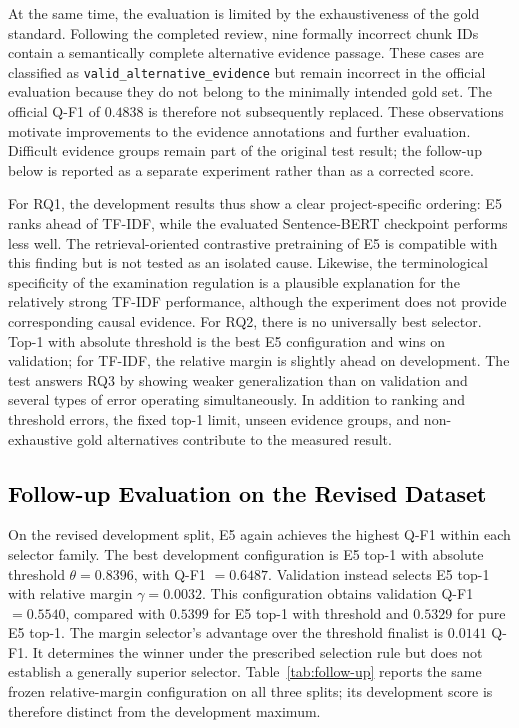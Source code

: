 \documentclass[11pt]{article}
\newcommand{\revision}[1]{#1}
\begin{document}
At the same time, the evaluation is limited by the exhaustiveness of the gold standard. Following the completed review, nine formally incorrect chunk IDs contain a semantically complete alternative evidence passage. These cases are classified as \texttt{valid\_alternative\_evidence} but remain incorrect in the official evaluation because they do not belong to the minimally intended gold set. The official Q-F1 of $0.4838$ is therefore not subsequently replaced. \revision{These observations motivate improvements to the evidence annotations and further evaluation. Difficult evidence groups remain part of the original test result; the follow-up below is reported as a separate experiment rather than as a corrected score.}

For RQ1, the development results thus show a clear project-specific ordering: E5 ranks ahead of TF-IDF, while the evaluated Sentence-BERT checkpoint performs less well. The retrieval-oriented contrastive pretraining of E5 is compatible with this finding but is not tested as an isolated cause. Likewise, the terminological specificity of the examination regulation is a plausible explanation for the relatively strong TF-IDF performance, although the experiment does not provide corresponding causal evidence. For RQ2, there is no universally best selector. Top-1 with absolute threshold is the best E5 configuration and wins on validation; for TF-IDF, the relative margin is slightly ahead on development. The test answers RQ3 by showing weaker generalization than on validation and several types of error operating simultaneously. In addition to ranking and threshold errors, the fixed top-1 limit, unseen evidence groups, and non-exhaustive gold alternatives contribute to the measured result.


\subsection{\textcolor{black}{Follow-up Evaluation on the Revised Dataset}}
\label{sec:follow-up}

\revision{On the revised development split, E5 again achieves the highest Q-F1 within each selector family. The best development configuration is E5 top-1 with absolute threshold $\theta=0.8396$, with Q-F1 $=0.6487$. Validation instead selects E5 top-1 with relative margin $\gamma=0.0032$. This configuration obtains validation Q-F1 $=0.5540$, compared with $0.5399$ for E5 top-1 with threshold and $0.5329$ for pure E5 top-1. The margin selector's advantage over the threshold finalist is $0.0141$ Q-F1. It determines the winner under the prescribed selection rule but does not establish a generally superior selector. Table~\ref{tab:follow-up} reports the same frozen relative-margin configuration on all three splits; its development score is therefore distinct from the development maximum.}
\end{document}
